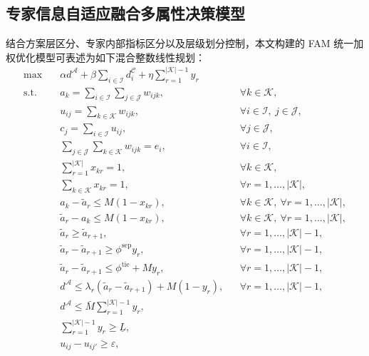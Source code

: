 \documentclass{article}
\begin{document}
\subsection{专家信息自适应融合多属性决策模型}

结合方案层区分、专家内部指标区分以及层级划分控制，本文构建的 FAM 统一加权优化模型可表述为如下混合整数线性规划：
\begin{align}
    \max \quad 
    & \alpha d^{\mathcal A}
    + \beta \sum_{i\in\mathcal I} d_i^{\mathcal C}
    + \eta \sum_{r=1}^{|\mathcal K|-1} y_r \label{eq:objective}\\
    \text{s.t.}\quad
    & a_k=\sum_{i\in\mathcal I}\sum_{j\in\mathcal J} w_{ijk},
    && \forall k\in\mathcal K, \\
    & u_{ij}=\sum_{k\in\mathcal K} w_{ijk},
    && \forall i\in\mathcal I,\ j\in\mathcal J, \\
    & c_j=\sum_{i\in\mathcal I} u_{ij},
    && \forall j\in\mathcal J, \\
    & \sum_{j\in\mathcal J}\sum_{k\in\mathcal K} w_{ijk}=e_i,
    && \forall i\in\mathcal I, \\
    & \sum_{r=1}^{|\mathcal K|} x_{kr}=1,
    && \forall k\in\mathcal K, \\
    & \sum_{k\in\mathcal K} x_{kr}=1,
    && \forall r=1,\dots,|\mathcal K|, \\
    & a_k-\tilde a_r \le M(1-x_{kr}),
    && \forall k\in\mathcal K,\ \forall r=1,\dots,|\mathcal K|, \\
    & \tilde a_r-a_k \le M(1-x_{kr}),
    && \forall k\in\mathcal K,\ \forall r=1,\dots,|\mathcal K|, \\
    & \tilde a_r\ge \tilde a_{r+1},
    && \forall r=1,\dots,|\mathcal K|-1, \\
    & \tilde a_r-\tilde a_{r+1} \ge \phi^{\mathrm{sep}} y_r,
    && \forall r=1,\dots,|\mathcal K|-1, \label{eq:model_gap}\\
    & \tilde a_r-\tilde a_{r+1} \le \phi^{\mathrm{tie}} + M y_r,
    && \forall r=1,\dots,|\mathcal K|-1, \label{eq:model_bound}\\
    & d^{\mathcal A}\le \lambda_r(\tilde a_r-\tilde a_{r+1}) + M(1-y_r),
    && \forall r=1,\dots,|\mathcal K|-1,\label{eq:model_diff} \\
    & d^{\mathcal A}\le \bar M \sum_{r=1}^{|\mathcal K|-1} y_r, \label{eq:level_protection}\\
    & \sum_{r=1}^{|\mathcal K|-1} y_r \ge \underline L, \label{eq:level_min}\\
    & u_{ij}-u_{ij'} \ge \varepsilon,

\end{align}
\end{document}
